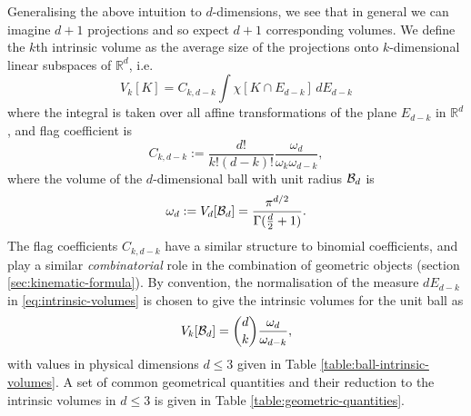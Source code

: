 Generalising the above intuition to $d$-dimensions, we see that in general we can imagine $d+1$ projections and so expect $d+1$ corresponding volumes.
We define the $k$th intrinsic volume as the average size of the projections onto $k$-dimensional linear subspaces of $\mathbb{R}^d$, i.e.\ \cite{Klain1997,Santalo2004}
\begin{equation}\label{eq:intrinsic-volumes}
  V_k[K]
  =
  C_{k,d-k}
  \int \chi[K \cap E_{d-k}] \, dE_{d-k}
\end{equation}
where the integral is taken over all affine transformations of the plane $E_{d-k}$ in $\mathbb{R}^d$, and flag coefficient is
\begin{equation}\label{eq:flag-coefficients}
  C_{k,d-k}
  :=
  \frac{d!}{k! (d-k)!} \frac{\omega_d}{\omega_k \omega_{d-k}},
\end{equation}
where the volume of the $d$-dimensional ball with unit radius $\mathcal{B}_d$ is
\begin{equation}
  \omega_d := V_d[\mathcal{B}_d] = \frac{\pi^{d/2}}{\Gamma(\frac{d}{2} + 1)}.
\end{equation}
The flag coefficients $C_{k,d-k}$ have a similar structure to binomial coefficients, and play a similar \emph{combinatorial} role in the combination of geometric objects (section \ref{sec:kinematic-formula}).
By convention, the normalisation of the measure $dE_{d-k}$ in \eqref{eq:intrinsic-volumes} is chosen to give the intrinsic volumes for the unit ball as
\begin{equation}\label{eq:intrinsic-volume-ball}
  V_k [\mathcal{B}_d]
  =
  {d \choose k} \frac{\omega_d}{\omega_{d-k}},
\end{equation}
with values in physical dimensions $d \le 3$ given in Table \ref{table:ball-intrinsic-volumes}.
A set of common geometrical quantities and their reduction to the intrinsic volumes in $d \le 3$ is given in Table \ref{table:geometric-quantities}.

